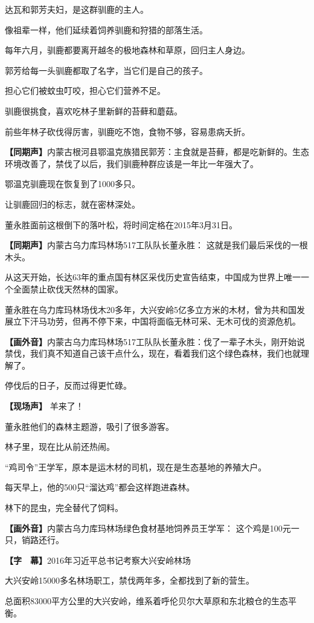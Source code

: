 \documentclass{ctexart}
\newcommand{\zkh}[1]{\textbf{\hspace{-2.7em} 【#1】}}
\begin{document}
 达瓦和郭芳夫妇，是这群驯鹿的主人。

 像祖辈一样，他们延续着饲养驯鹿和狩猎的部落生活。

 每年六月，驯鹿都要离开越冬的极地森林和草原，回归主人身边。

 郭芳给每一头驯鹿都取了名字，当它们是自己的孩子。

 担心它们被蚊虫叮咬，担心它们营养不足。

 驯鹿很挑食，喜欢吃林子里新鲜的苔藓和蘑菇。

 前些年林子砍伐得厉害，驯鹿吃不饱，食物不够，容易患病夭折。

 \zkh{同期声}内蒙古根河县鄂温克族猎民郭芳：主食就是苔藓，都是吃新鲜的。生态环境改善了，禁伐了以后，我们驯鹿种群应该是一年比一年强大了。

 鄂温克驯鹿现在恢复到了1000多只。

 让驯鹿回归的标志，就在密林深处。

 董永胜面前这根倒下的落叶松，将时间定格在2015年3月31日。

 \zkh{同期声}内蒙古乌力库玛林场517工队队长董永胜： 这就是我们最后采伐的一根木头。

 
从这天开始，长达63年的重点国有林区采伐历史宣告结束，中国成为世界上唯一一个全面禁止砍伐天然林的国家。

董永胜在乌力库玛林场伐木20多年，大兴安岭5亿多立方米的木材，曾为共和国发展立下汗马功劳，但再不停下来，中国将面临无林可采、无木可伐的资源危机。

 \zkh{画外音}内蒙古乌力库玛林场517工队队长董永胜：伐了一辈子木头，刚开始说禁伐，我们真不知道自己该干点什么，现在，看着我们这个绿色森林，我们也就理解了。

 停伐后的日子，反而过得更忙碌。

 \zkh{现场声} 羊来了！

 董永胜他们的森林主题游，吸引了很多游客。

 林子里，现在比从前还热闹。

 ``鸡司令''王学军，原本是运木材的司机，现在是生态基地的养殖大户。

 每天早上，他的500只``溜达鸡''都会这样跑进森林。

 林下的昆虫，完全替代了饲料。

 \zkh{画外音}内蒙古乌力库玛林场绿色食材基地饲养员王学军： 这个鸡是100元一只，销路还行。

 \zkh{字　幕}2016年习近平总书记考察大兴安岭林场

 大兴安岭15000多名林场职工，禁伐两年多，全都找到了新的营生。

 总面积83000平方公里的大兴安岭，维系着呼伦贝尔大草原和东北粮仓的生态平衡。
\end{document}
